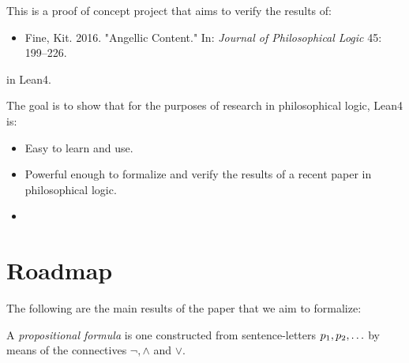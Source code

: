 %

This is a proof of concept project that aims to verify the results of:

\begin{itemize}
	\item Fine, Kit. 2016. "Angellic Content." In: \emph{Journal of Philosophical
		      Logic} 45: 199--226.
\end{itemize}

in Lean4.

The goal is to show that for the purposes of research in philosophical logic,
Lean4 is:

\begin{itemize}

	\item Easy to learn and use.
	\item Powerful enough to formalize and verify the results of a recent paper in
	      philosophical logic.
	\item

\end{itemize}

\section{Roadmap}

The following are the main results of the paper that we aim to formalize:

\begin{definition}
	\leanok
	A \emph{propositional formula} is one constructed from sentence-letters $p_1,
		p_2, \mathellipsis$ by means of the connectives $\neg,\land$ and $\lor$.
\end{definition}


